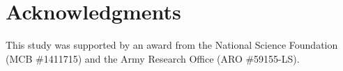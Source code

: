 \documentclass[processes,article,accept,moreauthors,pdftex,12pt,a4paper]{mdpi}
\begin{document}
%


\section*{\noindent Acknowledgments}\vspace{12pt}

This study was supported by an award from the National Science Foundation (MCB \#1411715) 
and the Army Research Office (ARO \#59155-LS).







%
%
%



%
\end{document}
